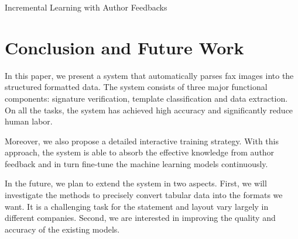 \documentclass[sigconf]{acmart}
\begin{document}
\begin{algorithm}[htb]
	\caption{Incremental Learning with Author Feedbacks}
	\label{algorithm1}
	\raggedright
	
\end{algorithm}

\section{Conclusion and Future Work}

In this paper, we present a system that automatically parses fax images into the structured formatted data. The system consists of three major functional components: signature verification, template classification and data extraction. On all the tasks, the system has achieved high accuracy and significantly reduce human labor.

Moreover, we also propose a detailed interactive training strategy. With this approach, the system is able to absorb the effective knowledge from author feedback and in turn fine-tune the machine learning models continuously.

In the future, we plan to extend the system in two aspects. First, we will investigate the methods to precisely convert tabular data into the formats we want. It is a challenging task for the statement and layout vary largely in different companies. Second, we are interested in improving the quality and accuracy of the existing models.




\end{document}
